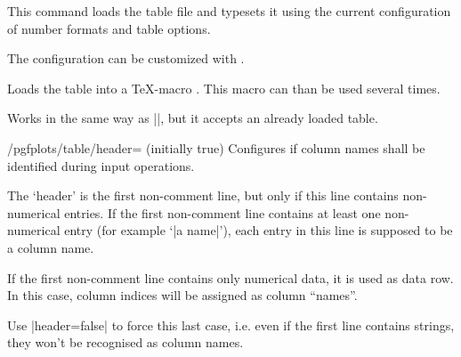 \begin{command}{}
	This command loads the table file  and typesets it using the current configuration of number formats and table options.
\begin{codeexample}[]
\end{codeexample}

	\noindent The configuration can be customized with .

\begin{codeexample}[]
\end{codeexample}
\end{command}

\begin{command}{\pgfplotstableread{}}
	Loads the table  into a \TeX-macro . This macro can than be used several times.
\begin{codeexample}[]
\table
\pgfplotstabletypeset[columns={dof,error1}]\table
\hspace{2cm}
\pgfplotstabletypeset[columns={dof,error2}]\table
\end{codeexample}
\end{command}

\begin{command}{}
	Works in the same way as |\pgfplotstabletypesetfile|, but it accepts an already loaded table.
\end{command}

\begin{key}{/pgfplots/table/header= (initially true)}
	Configures if column names shall be identified during input operations.

	The `header' is the first non-comment line, but only if this line contains non-numerical entries. If the first non-comment line contains at least one non-numerical entry (for example `|a name|'), each entry in this line is supposed to be a column name.

	If the first non-comment line contains only numerical data, it is used as data row. In this case, column indices will be assigned as column ``names''.

	Use |header=false| to force this last case, i.e. even if the first line contains strings, they won't be recognised as column names.
\end{key}

